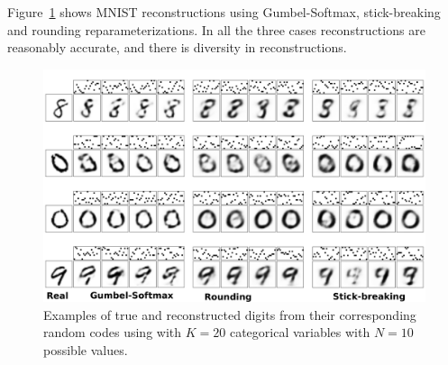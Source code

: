    

Figure~\ref{fig:VAE} shows MNIST reconstructions using Gumbel-Softmax,
stick-breaking and rounding reparameterizations. In all the three
cases reconstructions are reasonably accurate, and there is diversity
in reconstructions.
\begin{figure}[t]
  \centering
  \includegraphics[width=6.in]{../figures/figure4.pdf} 
  \caption{Examples of true and reconstructed digits from their corresponding random codes using with $K=20$ categorical variables with $N=10$ possible values.
  }
\label{fig:VAE}
\end{figure}


